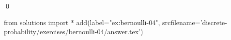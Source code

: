 
\begin{ex} 
  \label{ex:bernoulli-04}
  
  \qed
\end{ex} 
\begin{python0}
from solutions import *
add(label="ex:bernoulli-04",
    srcfilename='discrete-probability/exercises/bernoulli-04/answer.tex') 
\end{python0}
